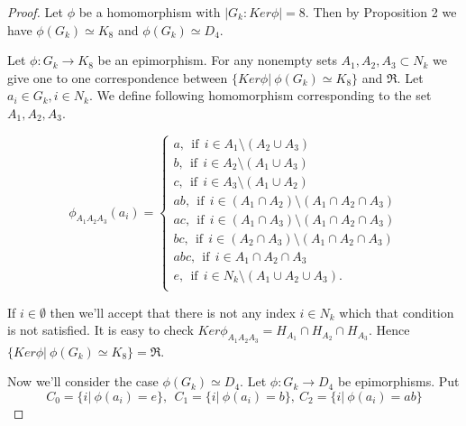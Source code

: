 \documentclass[12pt,reqno]{amsart}
\numberwithin{equation}{section}
\begin{document}
 \begin{proof} Let $\phi$ be a
homomorphism with $|G_{k}:Ker\phi|=8.$ Then by Proposition 2 we
have $\phi(G_{k})\simeq K_{8}$ and $\phi(G_{k})\simeq D_{4}.$

 Let $\phi:G_{k}\rightarrow K_{8}$ be an epimorphism. For any
 nonempty sets $A_{1},A_{2},A_{3}\subset N_{k}$ we give one to one
 correspondence between $\{Ker\phi| \ \phi(G_{k})\simeq K_{8}\}$ and
 $\Re.$ Let $a_{i}\in G_{k}, i\in N_{k}.$
We define following homomorphism corresponding to the set $A_{1},
A_{2}, A_{3}.$

$$\phi_{A_{1}A_{2}A_{3}}(a_{i})=\left\{\begin{array}{ll}
a, \ \ \mbox{if} \ \ i\in A_{1}\setminus(A_{2}\cup A_{3})\\[2.5mm]
b, \ \ \mbox{if} \ \ i\in A_{2}\setminus(A_{1}\cup A_{3})\\[2.5mm]
c, \ \ \mbox{if} \ \ i\in A_{3}\setminus(A_{1}\cup A_{2})\\[2.5mm]
ab, \ \ \mbox{if} \ \ i\in (A_{1}\cap A_{2})\setminus(A_{1}\cap A_{2}\cap A_{3})\\[2.5mm]
ac, \ \ \mbox{if} \ \ i\in (A_{1}\cap A_{3})\setminus(A_{1}\cap A_{2}\cap A_{3})\\[2.5mm]
bc, \ \ \mbox{if} \ \ i\in (A_{2}\cap A_{3})\setminus(A_{1}\cap A_{2}\cap A_{3})\\[2.5mm]
abc, \ \ \mbox{if} \ \ i\in A_{1}\cap A_{2}\cap A_{3}\\[2.5mm]
e, \ \ \mbox{if} \ \ i\in N_{k}\setminus(A_{1}\cup A_{2}\cup
A_{3}). \\
\end{array}\right.$$

If $i\in \emptyset$ then we'll accept that there is not any index
$i\in N_{k}$ which that condition is not satisfied. It is easy to
check $Ker \phi_{A_{1}A_{2}A_{3}}=H_{A_{1}}\cap H_{A_{2}}\cap
H_{A_{3}}.$ Hence $\{Ker\phi| \ \phi(G_{k})\simeq K_{8}\}=\Re.$

Now we'll consider the case $\phi(G_{k})\simeq D_{4}.$ Let $\phi:
G_{k}\rightarrow D_{4}$ be epimorphisms. Put\\
$$C_{0}=\{i| \ \phi(a_{i})=e\}, \ \ C_{1}=\{i| \ \phi(a_{i})=b\},\  C_{2}=\{i| \ \phi(a_{i})=ab\}$$


\end{proof}
\end{document}
